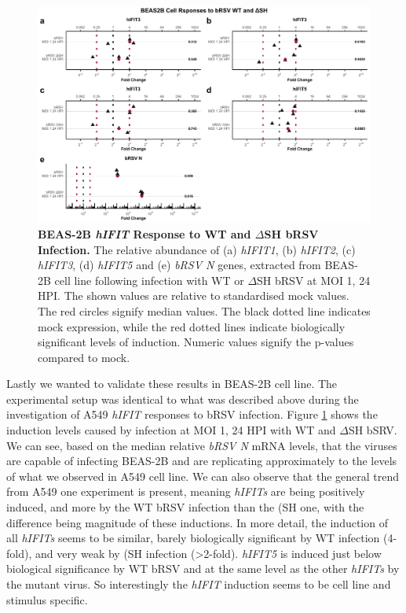 \begin{figure}
    \centering
    \includegraphics[width=1\linewidth]{06. Chapter 1/Figs/01. Induction/11. beas2b_brsv_moi1.pdf}
    \caption[BEAS-2B \textit{hIFIT} Response to WT and \(\Delta\)SH bRSV Infection.]{\textbf{BEAS-2B \textit{hIFIT} Response to WT and \(\Delta\)SH bRSV Infection.} The relative abundance of (a) \textit{hIFIT1}, (b) \textit{hIFIT2}, (c) \textit{hIFIT3}, (d) \textit{hIFIT5} and (e) \textit{bRSV N} genes, extracted from BEAS-2B cell line following infection with WT or \(\Delta\)SH bRSV at MOI 1, 24 HPI.  The shown values are relative to standardised mock values. The red circles signify median values. The black dotted line indicates mock expression, while the red dotted lines indicate biologically significant levels of induction. Numeric values signify the p-values compared to mock.}
    \label{BEAS-2B responses to bRSV WT and dSH.}
\end{figure}


Lastly we wanted to validate these results in BEAS-2B cell line. The experimental setup was identical to what was described above during the investigation of A549 \textit{hIFIT} responses to bRSV infection. Figure \ref{BEAS-2B responses to bRSV WT and dSH.} shows the induction levels caused by infection at MOI 1, 24 HPI with WT and \(\Delta\)SH bSRV. We can see, based on the median relative \textit{bRSV N} mRNA levels, that the viruses are capable of infecting BEAS-2B and are replicating approximately to the levels of what we observed in A549 cell line. We can also observe that the general trend from A549 one experiment is present, meaning \textit{hIFITs} are being positively induced, and more by the WT bRSV infection than the (\Delta\)SH one, with the difference being magnitude of these inductions. In more detail, the induction of all \textit{hIFITs} seems to be similar, barely biologically significant by WT infection (4-fold), and very weak by (\Delta\)SH infection (>2-fold). \textit{hIFIT5} is induced just below biological significance by WT bRSV and at the same level as the other \textit{hIFITs} by the mutant virus. So interestingly the \textit{hIFIT} induction seems to be cell line and stimulus specific.


